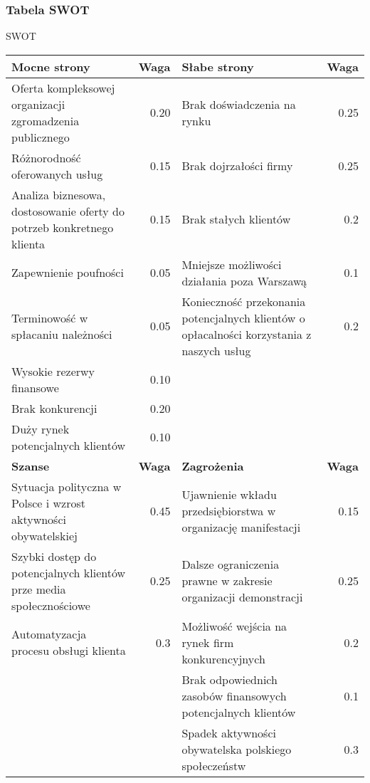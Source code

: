 \documentclass{article}
\begin{document}
\subsubsection{Tabela SWOT}
\begin{table}[H]
\begin{center}

\tablename{  SWOT}


\begin{tabular}{|m{4.5cm}|r|m{4.5cm}|r|}
\hline
\textbf{Mocne strony} & \textbf{Waga} & \textbf{Słabe strony} & \textbf{Waga} \\
\hline
Oferta kompleksowej organizacji zgromadzenia publicznego & 0.20 & Brak doświadczenia na rynku & 0.25 \\
\hline
Różnorodność oferowanych usług & 0.15 & Brak dojrzałości firmy & 0.25 \\
\hline
Analiza biznesowa, dostosowanie oferty do potrzeb konkretnego klienta & 0.15 & Brak stałych klientów & 0.2 \\
\hline
Zapewnienie poufności & 0.05 & Mniejsze możliwości działania poza Warszawą & 0.1 \\
\hline
Terminowość w spłacaniu należności & 0.05 & Konieczność przekonania potencjalnych klientów o opłacalności korzystania z naszych usług & 0.2 \\
\hline
Wysokie rezerwy finansowe & 0.10 & &\\
\hline
Brak konkurencji & 0.20   & &\\
\hline
Duży rynek potencjalnych klientów & 0.10 & & \\
\hline


\textbf{Szanse} & \textbf{Waga} & \textbf{Zagrożenia} & \textbf{Waga}\\
\hline 
Sytuacja polityczna w Polsce i wzrost aktywności obywatelskiej & 0.45 & Ujawnienie wkładu przedsiębiorstwa w organizację manifestacji & 0.15 \\
\hline
Szybki dostęp do potencjalnych klientów prze media społecznościowe & 0.25 & Dalsze ograniczenia prawne w zakresie organizacji demonstracji & 0.25\\
\hline
Automatyzacja procesu obsługi klienta & 0.3 & Możliwość wejścia na rynek firm konkurencyjnych & 0.2 \\
\hline
& & Brak odpowiednich zasobów finansowych potencjalnych klientów & 0.1 \\
\hline
& & Spadek aktywności obywatelska polskiego społeczeństw & 0.3 \\



\hline
\end{tabular}

\end{center}
\end{table}
\end{document}
